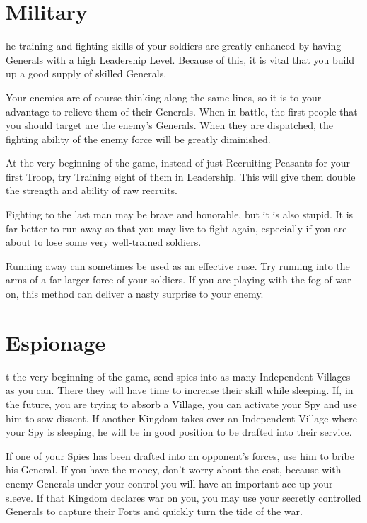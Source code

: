 \section{Military}


he training and fighting skills of your soldiers are greatly enhanced by having Generals with a high Leadership Level. Because of this, it is vital that you build up a good supply of skilled Generals.


Your enemies are of course thinking along the same lines, so it is to your advantage to relieve them of their Generals. When in battle, the first people that you should target are the enemy’s Generals. When they are dispatched, the fighting ability of the enemy force will be greatly diminished.

At the very beginning of the game, instead of just Recruiting Peasants for your first Troop, try Training eight of them in Leadership. This will give them double the strength and ability of raw recruits.


Fighting to the last man may be brave and honorable, but it is also stupid. It is far better to run away so that you may live to fight again, especially if you are about to lose some very well-trained soldiers.

Running away can sometimes be used as an effective ruse. Try running into the arms of a far larger force of your soldiers. If you are playing with the fog of war on, this method can deliver a nasty surprise to your enemy.

\section{Espionage}


t the very beginning of the game, send spies into as many Independent Villages as you can. There they will have time to increase their skill while sleeping. If, in the future, you are trying to absorb a Village, you can activate your Spy and use him to sow dissent. If another Kingdom takes over an Independent Village where your Spy is sleeping, he will be in good position to be drafted into their service.

If one of your Spies has been drafted into an opponent’s forces, use him to bribe his General. If you have the money, don’t worry about the cost, because with enemy Generals under your control you will have an important ace up your sleeve. If that Kingdom declares war on you, you may use your secretly controlled Generals to capture their Forts and quickly turn the tide of the war.

